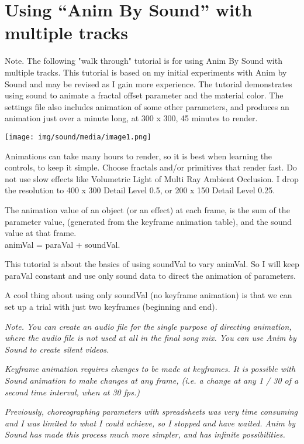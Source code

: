 \section{Using ``Anim By Sound'' with multiple
tracks}\label{using-anim-by-sound-with-multiple-tracks}

Note. The following "walk through" tutorial is for using Anim By Sound
with multiple tracks. This tutorial is based on my initial experiments
with Anim by Sound and may be revised as I gain more experience. The
tutorial demonstrates using sound to animate a fractal offset parameter
and the material color. The settings file also includes animation of
some other parameters, and produces an animation just over a minute
long, at 300 x 300, 45 minutes to render.

\texttt{[image: img/sound/media/image1.png]}

Animations can take many hours to render, so it is best when learning
the controls, to keep it simple. Choose fractals and/or primitives that
render fast. Do not use slow effects like Volumetric Light of Multi Ray
Ambient Occlusion. I drop the resolution to 400 x 300 Detail Level 0.5,
or 200 x 150 Detail Level 0.25.

The animation value of an object (or an effect) at each frame, is the
sum of the parameter value, (generated from the keyframe animation
table), and the sound value at that frame.\\
animVal = paraVal + soundVal.

This tutorial is about the basics of using soundVal to vary animVal. So
I will keep paraVal constant and use only sound data to direct the
animation of parameters.

A cool thing about using only soundVal (no keyframe animation) is that
we can set up a trial with just two keyframes (beginning and end).

\emph{Note. You can create an audio file for the single purpose of
directing animation, where the audio file is not used at all in the
final song mix. You can use Anim by Sound to create silent videos.}

\emph{Keyframe animation requires changes to be made at keyframes. It is
possible with Sound animation to make changes at any frame, (i.e. a
change at any 1 / 30 of a second time interval, when at 30 fps.)}

\emph{Previously, choreographing parameters with spreadsheets was very
time consuming and I was limited to what I could achieve, so I stopped
and have waited. Anim by Sound has made this process much more simpler,
and has infinite possibilities.}

